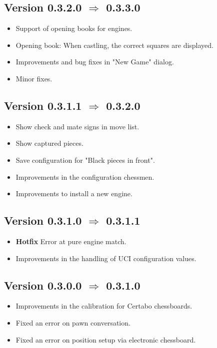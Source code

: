 \documentclass[11pt,a4paper]{article}
\begin{document}
\subsection*{Version 0.3.2.0  $\Rightarrow$ 0.3.3.0}
\begin{itemize}
    \item Support of opening books for engines.
    \item Opening book: When castling, the correct squares are displayed.
	\item Improvements and bug fixes in "New Game" dialog.
	\item Minor fixes.	
\end{itemize}

\subsection*{Version 0.3.1.1  $\Rightarrow$  0.3.2.0}
\begin{itemize}
	\item Show check and mate signs in move list.
	\item Show captured pieces.	
    \item Save configuration for "Black pieces in front".
	\item Improvements in the configuration chessmen.
	\item Improvements to install a new engine.
\end{itemize}

\subsection*{Version 0.3.1.0  $\Rightarrow$  0.3.1.1}
\begin{itemize}
	\item \textbf{Hotfix} Error at pure engine match.
	\item Improvements in the handling of UCI configuration values.
\end{itemize}

\subsection*{Version 0.3.0.0  $\Rightarrow$  0.3.1.0}
\begin{itemize}
	    \item Improvements in the calibration for Certabo chessboards.
	    \item Fixed an error on pawn conversation.
   	    \item Fixed an error on position setup via electronic chessboard.
\end{itemize}
\end{document}
